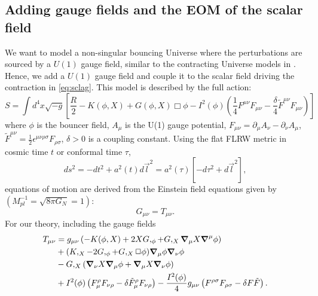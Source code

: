 \documentclass[12pt,a4paper]{article}
\newcommand{\be}{\begin{equation}}
\newcommand{\ee}{\end{equation}}
\numberwithin{equation}{section}
\numberwithin{equation}{section}
\begin{document}
\subsection{Adding gauge fields and the EOM of the scalar field}
We want to model a non-singular bouncing Universe where the perturbations are sourced by a $U(1)$ gauge field, similar to the contracting Universe models in \cite{r1,r4,Artymowski:2018ewb}. Hence, we add a $U(1)$ gauge field and couple it to the scalar field driving the contraction in \eqref{eq:sclag}. %
This model is described by the full action: 
\begin{equation}
S = \int d^4x \sqrt{-g} \left[\frac{R}{2}-K(\phi,X)+G(\phi,X)\Box \phi-I^2(\phi) \left( \frac{1}{4}F^{\mu\nu}F_{\mu \nu} -\frac{\delta}{4}\tilde{F}^{\mu \nu}F_{\mu\nu}\right) \right] \label{eq:vecaction}
\end{equation}
where $\phi$ is the bouncer field, $A_{\mu}$ is the U(1) gauge potential,  $F_{\mu\nu} = \partial_\mu A_\nu - \partial_\nu A_\mu$, $\tilde{F}^{\mu\nu} = \frac{1}{2}\epsilon^{\mu\nu\rho\sigma}F_{\rho\sigma}$,  $\delta>0$ is a coupling constant. 
Using the flat FLRW metric in cosmic time $t$ or conformal time $\tau$,
\be
ds^2=-dt^2+a^2(t) d\vec{l}^2=a^2(\tau)[-d\tau^2+d\vec{l}^2],
\ee
equations of motion are derived from the Einstein field equations given by $(M_{pl}^{-1}=\sqrt{8\pi G_N}=1)$:
\begin{equation}
    G_{\mu \nu} = T_{\mu \nu}.
\end{equation}
For our theory, including the gauge fields 
\begin{equation}
\begin{split}
    T_{\mu \nu} &= g_{\mu \nu}\left(-K(\phi,X)+2 X G,_{\phi} + G,_{X} \grad_{\mu} X \grad^{\mu} \phi \right) \\
    & + (K,_X- 2 G,_{\phi}+G,_X \Box \phi) \grad_{\mu} \phi \grad_{\nu} \phi \\
    &- G,_{X} (\grad_{\nu} X \grad_{\mu} \phi+\grad_{\mu}X \grad_{\nu} \phi ) \\
    & + I^2(\phi) \left(F_{\mu}^{\rho} F_{\nu\rho} - \delta \tilde{F}_{\mu}^{\rho} F_{\nu\rho} \right) - \frac{I^2(\phi)}{4} g_{\mu \nu}\left(F^{\rho \sigma}F_{\rho \sigma}-\delta F \Tilde{F} \right).
    \end{split}
    \label{eq:emt}
\end{equation}
\end{document}
